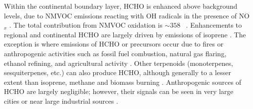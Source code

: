     Within the continental boundary layer, HCHO is enhanced above background levels, due to NMVOC emissions reacting with OH radicals in the presence of NO$_x$ \parencite{Wagner2002, Millet2006, Kefauver2014}.
    The total contribution from NMVOC oxidation is $\sim 358$\tgpyr 
    ~\parencite{FortemsCheiney2012}.
    Enhancements to regional and continental HCHO are largely driven by emissions of isoprene \parencite{Guenther1995,Palmer2003, Shim2005, Kefauver2014}.
    The exception is where emissions of HCHO or precursors occur due to fires or anthropogenic activities such as fossil fuel combustion, natural gas flaring, ethanol refining, and agricultural activity \parencite{Guenther1995, Kefauver2014, Wolfe2016}.
    Other terpenoids (monoterpenes, sesquiterpenes, etc.) can also produce HCHO, although generally to a lesser extent than isoprene, methane and biomass burning \parencite{Guenther2012}.
    Anthropogenic sources of HCHO are largely negligible; however, their signals can be seen in very large cities or near large industrial sources \parencite{Millet2008,Zhu2014}.
    
